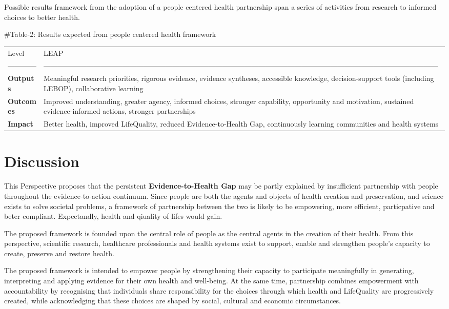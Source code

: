 \documentclass{article}
\begin{document}
Possible results framework from the adoption of a people centered health partnership span a series of activities from research  to informed choices  to better health.

\#Table-2: Results expected from people centered health framework
\begin{center}
\begin{tabular}{ll}
Level & LEAP\\
------------ & ---------------------------------------------------------------------------------------------------------------------------------------------------------------------\\
\textbf{\textbf{Outputs}} & Meaningful research priorities, rigorous evidence, evidence syntheses, accessible knowledge, decision-support tools (including LEBOP), collaborative learning\\
\textbf{\textbf{Outcomes}} & Improved understanding, greater agency, informed choices, stronger capability, opportunity and motivation, sustained evidence-informed actions, stronger partnerships\\
\textbf{\textbf{Impact}} & Better health, improved LifeQuality, reduced Evidence-to-Health Gap, continuously learning communities and health systems\\
\hline
\end{tabular}
\end{center}
\section{Discussion}
\label{sec:org19e8ae2}
This Perspective proposes that the persistent \textbf{\textbf{Evidence-to-Health Gap}} may be partly explained by insufficient partnership with people throughout the evidence-to-action continuum. Since people are both the agents and objects of health creation and preservation, and science exists to solve societal problems, a framework of partnership between the two is likely to be empowering, more efficient, particpative and beter compliant. Expectandly, health and qiuality of lifes would gain.

The proposed framework is founded upon the central role of people as the central agents in the creation of their health. From this perspective, scientific research, healthcare professionals and health systems exist to support, enable and strengthen people's capacity to create, preserve and restore health.

The proposed framework is intended to empower people by strengthening their capacity to participate meaningfully in generating, interpreting and applying evidence for their own health and well-being. At the same time, partnership combines empowerment with accountability by recognising that individuals share responsibility for the choices through which health and LifeQuality are progressively created, while acknowledging that these choices are shaped by social, cultural and economic circumstances.
\end{document}
